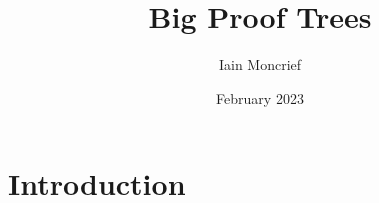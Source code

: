 \documentclass{article}
\title{Big Proof Trees}
\author{Iain Moncrief}
\date{February 2023}
\begin{document}

\maketitle

\section{Introduction}
\end{document}
